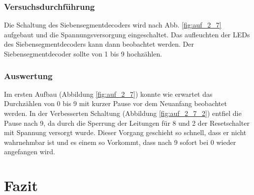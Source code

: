 \documentclass[12pt,a4paper]{article}
\begin{document}
\subsubsection*{Versuchsdurchführung}
Die Schaltung des Siebensegmentdecoders wird nach Abb. \ref{fig:auf_2_7} aufgebaut und die Spannungsversorgung eingeschaltet. Das aufleuchten der LEDs des Siebensegmentdecoders kann dann beobachtet werden. Der Siebensegmentdecoder sollte von 1 bis 9 hochzählen.

\subsubsection*{Auswertung}

Im ersten Aufbau (Abbildung \ref{fig:auf_2_7}) konnte wie erwartet das Durchzählen von 0 bis 9 mit kurzer Pause vor dem Neuanfang beobachtet werden. In der Verbesserten Schaltung (Abbildung \ref{fig:auf_2_7_2}) entfiel die Pause nach 9, da durch die Sperrung der Leitungen für 8 und 2 der Resetschalter mit Spannung versorgt wurde. Dieser Vorgang geschieht so schnell, dass er nicht wahrnehmbar ist und es einem so Vorkommt, dass nach 9 sofort bei 0 wieder angefangen wird.


\section{Fazit}
\end{document}
